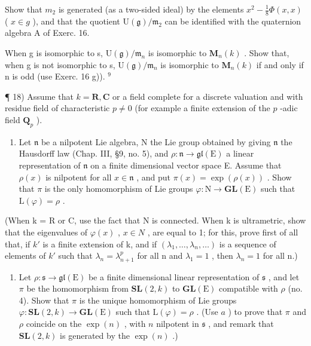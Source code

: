 Show that \(m_{2}\) is generated (as a two-sided ideal) by the elements \(x^{2}-\frac{1}{8}\Phi(x,x)\) ( \(x\in g\) ), and that the quotient \(\mathrm{U}(\mathfrak{g})/\mathfrak{m}_{2}\) can be identified with the quaternion algebra A of Exerc. 16.

When g is isomorphic to s, \(\mathrm{U}(\mathfrak{g})/\mathfrak{m}_{n}\) is isomorphic to \(\mathbf{M}_{n}(k)\) . Show that, when g is not isomorphic to s, \(\mathrm{U}(\mathfrak{g})/\mathfrak{m}_{n}\) is isomorphic to \(\mathbf{M}_{n}(k)\) if and only if n is odd (use Exerc. 16 g)). \(^{9}\)


¶ 18) Assume that \(k = \mathbf{R}, \mathbf{C}\) or a field complete for a discrete valuation and with residue field of characteristic \(p \neq 0\) (for example a finite extension of the \(p\) -adic field \(\mathbf{Q}_p\) ).

\begin{enumerate}
\def\labelenumi{\alph{enumi})}
\tightlist
\item
  Let \(\mathfrak{n}\) be a nilpotent Lie algebra, N the Lie group obtained by giving \(\mathfrak{n}\) the Hausdorff law (Chap. III, §9, no. 5), and \(\rho : \mathfrak{n} \to \mathfrak{gl}(\mathrm{E})\) a linear representation of \(\mathfrak{n}\) on a finite dimensional vector space E. Assume that \(\rho(x)\) is nilpotent for all \(x \in \mathfrak{n}\) , and put \(\pi(x) = \exp(\rho(x))\) . Show that \(\pi\) is the only homomorphism of Lie groups \(\varphi : \mathrm{N} \to \mathbf{GL}(\mathrm{E})\) such that \(\mathrm{L}(\varphi) = \rho\) .
\end{enumerate}

(When k = R or C, use the fact that N is connected. When k is ultrametric, show that the eigenvalues of \(\varphi(x)\) , \(x \in N\) , are equal to 1; for this, prove first of all that, if \(k'\) is a finite extension of k, and if \((\lambda_{1}, \ldots, \lambda_{n}, \ldots)\) is a sequence of elements of \(k'\) such that \(\lambda_{n} = \lambda_{n+1}^{p}\) for all n and \(\lambda_{1} = 1\) , then \(\lambda_{n} = 1\) for all n.)

\begin{enumerate}
\def\labelenumi{\alph{enumi})}
\setcounter{enumi}{1}
\tightlist
\item
  Let \(\rho : \mathfrak{s} \to \mathfrak{gl}(\mathrm{E})\) be a finite dimensional linear representation of \(\mathfrak{s}\) , and let \(\pi\) be the homomorphism from \(\mathbf{SL}(2, k)\) to \(\mathbf{GL}(\mathrm{E})\) compatible with \(\rho\) (no. 4). Show that \(\pi\) is the unique homomorphism of Lie groups \(\varphi : \mathbf{SL}(2, k) \to \mathbf{GL}(\mathrm{E})\) such that \(\mathrm{L}(\varphi) = \rho\) . (Use \(a\) ) to prove that \(\pi\) and \(\rho\) coincide on the \(\exp(n)\) , with \(n\) nilpotent in \(\mathfrak{s}\) , and remark that \(\mathbf{SL}(2, k)\) is generated by the \(\exp(n)\) .)
\end{enumerate}

